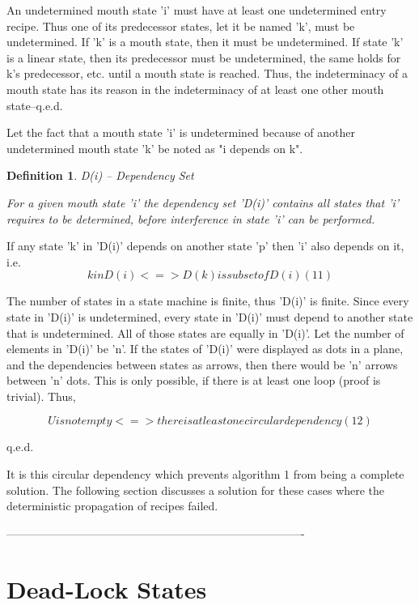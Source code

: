 \documentclass[12pt]{article}
\newtheorem{definition}{Definition}
\begin{document}
An undetermined mouth state 'i' must have at least one undetermined entry
recipe. Thus one of its predecessor states, let it be named 'k', must be
undetermined. If 'k' is a mouth state, then it must be undetermined.  If state
'k' is a linear state, then its predecessor must be undetermined, the same
holds for k's predecessor, etc. until a mouth state is reached. Thus, the
indeterminacy of a mouth state has its reason in the indeterminacy of at least
one other mouth state--q.e.d. 

Let the fact that a mouth state 'i' is undetermined because of another undetermined
mouth state 'k' be noted as "i depends on k". 

\begin{definition}
D(i) -- Dependency Set 

For a given mouth state 'i' the dependency set 'D(i)' contains all states
that 'i' requires to be determined, before interference in state 'i' can be
performed.
\end{definition}

If any state 'k' in 'D(i)' depends on another state 'p' then 'i' also depends
on it, i.e.
\[
                   k in D(i) <=> D(k) is subset of D(i)                    (11)
\]

The number of states in a state machine is finite, thus 'D(i)' is finite. Since
every state in 'D(i)' is undetermined, every state in 'D(i)' must depend to
another state that is undetermined. All of those states are equally in 'D(i)'.
Let the number of elements in 'D(i)' be 'n'. If the states of 'D(i)' were
displayed as dots in a plane, and the dependencies between states as arrows,
then there would be 'n' arrows between 'n' dots. This is only
possible, if there is at least one loop (proof is trivial). Thus, 

\[
         U is not empty <=> there is at least one circular dependency      (12)
\]

q.e.d.

It is this circular dependency which prevents algorithm 1 from being a complete
solution. The following section discusses a solution for these cases where 
the deterministic propagation of recipes failed.

-------------------------------------------------------------------------------

\section{Dead-Lock States}
\end{document}
